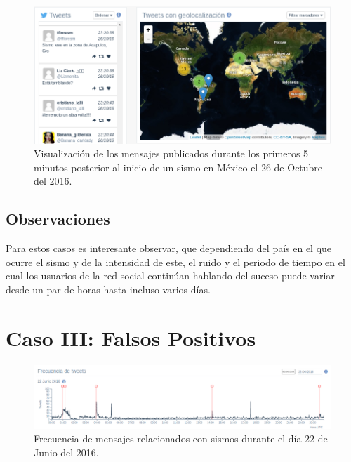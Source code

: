 	\begin{figure}[!h]
	  \centering
	  \includegraphics[width=\textwidth]{imagenes/sismomexicoleve.png}
	  \caption{Visualización de los mensajes publicados durante los primeros 5 minutos posterior al inicio de un sismo en México el 26 de Octubre del 2016.}
		\label{fig:sismomexicoleve}
	\end{figure}
	
	 
	\subsection{Observaciones}	 
	
	Para estos casos es interesante observar, que dependiendo del país en el que ocurre el sismo y de la intensidad de este, el ruido y el periodo de tiempo en el cual los usuarios de la red social continúan hablando del suceso puede variar desde un par de horas hasta incluso varios días.
	
	\section{Caso III: Falsos Positivos}
	\label{sec:casosfalsos}
	
	\begin{figure}[h]
	  \centering
	  \includegraphics[trim={0 0 0 0}, clip, width=\textwidth]{imagenes/22junio2016-freq.png}
	  \caption{Frecuencia de mensajes relacionados con sismos durante el día 22 de Junio del 2016.}
		\label{fig:timeline-22junio}
	\end{figure}	
	
